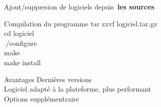 \documentclass[french]{beamer}
\begin{document}
%
%



\begin{frame}
Ajout/suppresion de logiciels depuis\
\textbf{les sources}
\begin{block}{Compilation du programme}
tar zxvf logiciel.tar.gz\\
cd logiciel\\
./configure\\
make\\
make install\\
\end{block}
\begin{block}{Avantages}
Dernières versions\\
Logiciel adapté à la plateforme, plus performant\\
Options supplémentraire\\
\end{block}
\end{frame}
\end{document}
